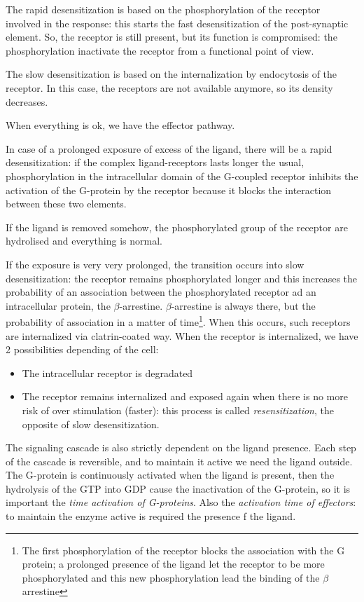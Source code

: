 \documentclass[a4paper, 12pt]{book}
\begin{document}
The rapid desensitization is based on the phosphorylation of the receptor involved in the response: this starts the fast desensitization of the post-synaptic element. So, the receptor is still present, but its function is compromised: the phosphorylation inactivate the receptor from a functional point of view.

The slow desensitization is based on the internalization by endocytosis of the receptor. In this case, the receptors are not available anymore, so its density decreases.

When everything is ok, we have the effector pathway. 

In case of a prolonged exposure of excess of the ligand, there will be a rapid desensitization: if the complex ligand-receptors lasts longer the usual, phosphorylation in the intracellular domain of the G-coupled receptor inhibits the activation of the G-protein by the receptor because it blocks the interaction between these two elements. 

If the ligand is removed somehow, the phosphorylated group of the receptor are hydrolised and everything is normal. 

If the exposure is very very prolonged, the transition occurs into slow desensitization: the receptor remains phosphorylated longer and this increases the probability of an association between the phosphorylated receptor ad an intracellular protein, the $\beta$-arrestine. $\beta$-arrestine is always there, but the probability of association in a matter of time\footnote{The first phosphorylation of the receptor blocks the association with the G protein; a prolonged presence of the ligand let the receptor to be more phosphorylated and this new phosphorylation lead the binding of the $\beta$ arrestine}. When this occurs, such receptors are internalized via clatrin-coated way. When the receptor is internalized, we have 2 possibilities depending of the cell:
\begin{itemize}
\item{The intracellular receptor is degradated}
\item{The receptor remains internalized and exposed again when there is no more risk of over stimulation (faster): this process is called \emph{resensitization}, the opposite of slow desensitization.}
\end{itemize}

The signaling cascade is also strictly dependent on the ligand presence. Each step of the cascade is reversible, and to maintain it active we need the ligand outside. The G-protein is continuously activated when the ligand is present, then the hydrolysis of the GTP into GDP cause the inactivation of the G-protein, so it is important the \emph{time activation of G-proteins}. Also the \emph{activation time of effectors}: to maintain the enzyme active is required the presence f the ligand. 
\end{document}

